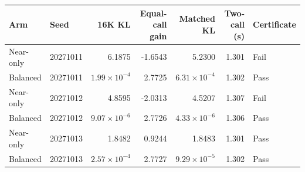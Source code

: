 \begin{tabular}{llrrrrl}
\toprule
Arm & Seed & 16K KL & Equal-call gain & Matched KL & Two-call (s) & Certificate \\
\midrule
Near-only & 20271011 & 6.1875 & -1.6543 & 5.2300 & 1.301 & Fail \\
Balanced & 20271011 & $1.99\times10^{-4}$ & 2.7725 & $6.31\times10^{-4}$ & 1.302 & Pass \\
Near-only & 20271012 & 4.8595 & -2.0313 & 4.5207 & 1.307 & Fail \\
Balanced & 20271012 & $9.07\times10^{-6}$ & 2.7726 & $4.33\times10^{-6}$ & 1.306 & Pass \\
Near-only & 20271013 & 1.8482 & 0.9244 & 1.8483 & 1.301 & Pass \\
Balanced & 20271013 & $2.57\times10^{-4}$ & 2.7727 & $9.29\times10^{-5}$ & 1.302 & Pass \\
\bottomrule
\end{tabular}
